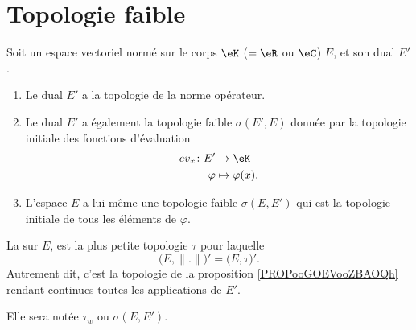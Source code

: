


\section{Topologie faible}



\begin{definition}        \label{DEFooZGLDooRRarRj}
	Soit un espace vectoriel normé sur le corps \( \eK\) (\( =\eR\) ou \( \eC\)) \( E\), et son dual \( E'\).
	\begin{enumerate}
		\item
		      Le dual \( E'\) a la topologie de la norme opérateur.
		\item		\label{ITEMooBTIQooTQrtWt}
		      Le dual \( E'\) a également la topologie faible \( \sigma(E',E)\) donnée par la topologie initiale des fonctions d'évaluation
		      \begin{equation}
			      \begin{aligned}
				      ev_x\colon E' & \to \eK             \\
				      \varphi       & \mapsto \varphi(x).
			      \end{aligned}
		      \end{equation}
		\item
		      L'espace \( E\) a lui-même une topologie faible \( \sigma(E,E')\) qui est la topologie initiale de tous les éléments de \( \varphi\).
	\end{enumerate}


	La  sur \( E\), est la plus petite topologie \( \tau\) pour laquelle
	\begin{equation}
		\big( E,\| . \| \big)'=\big( E,\tau \big)'.
	\end{equation}
	Autrement dit, c'est la topologie de la proposition \ref{PROPooGOEVooZBAOQh} rendant continues toutes les applications de \( E'\).

	Elle sera notée \( \tau_w\) ou \( \sigma(E,E')\).
\end{definition}

